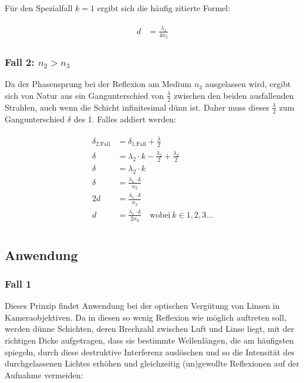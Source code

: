 \noindent Für den Spezialfall $k=1$ ergibt sich die häufig zitierte Formel:

\begin{align}	\label{eq:duenneschichtfall1spezial}
\begin{split}
	d  &= \frac{\lambda_1}{4n_2}
\end{split}
\end{align}


\subsubsection{Fall 2: $n_2 > n_3$}

\noindent Da der Phasensprung bei der Reflexion am Medium $n_3$ ausgelassen wird, ergibt sich von Natur aus ein Gangunterschied von $\frac{\lambda}{2}$ zwischen den beiden ausfallenden Strahlen, auch wenn die Schicht infinitesimal dünn ist. Daher muss dieses $\frac{\lambda}{2}$ zum Gangunterschied $\delta$ des 1. Falles addiert werden:

\begin{align}
\begin{split}
	\delta_{\text{2.Fall}} &= \delta_{\text{1.Fall}} + \frac{\lambda}{2} \\
	\delta &= \lambda_2 \cdot k - \frac{\lambda_2}{2} + \frac{\lambda_2}{2} \\
	\delta &= \lambda_2 \cdot k \\
	\delta &= \frac{\lambda_1 \cdot k}{n_2} \\
	2d &= \frac{\lambda_1 \cdot k}{n_2} \\
	d &= \frac{\lambda_1 \cdot k}{2n_2} \quad \text{wobei} \ k \in 1,2,3... \\
\end{split}
\end{align}


\subsection{Anwendung}

\subsubsection{Fall 1}

Dieses Prinzip findet Anwendung bei der optischen Vergütung von Linsen in Kameraobjektiven. Da in diesen so wenig Reflexion wie möglich auftreten soll, werden dünne Schichten, deren Brechzahl zwischen Luft und Linse liegt, mit der richtigen Dicke aufgetragen, dass sie bestimmte Wellenlängen, die am häufigsten spiegeln, durch diese destruktive Interferenz auslöschen und so die Intensität des durchgelassenen Lichtes erhöhen und gleichzeitig (un)gewollte Reflexionen auf der Aufnahme vermeiden:

